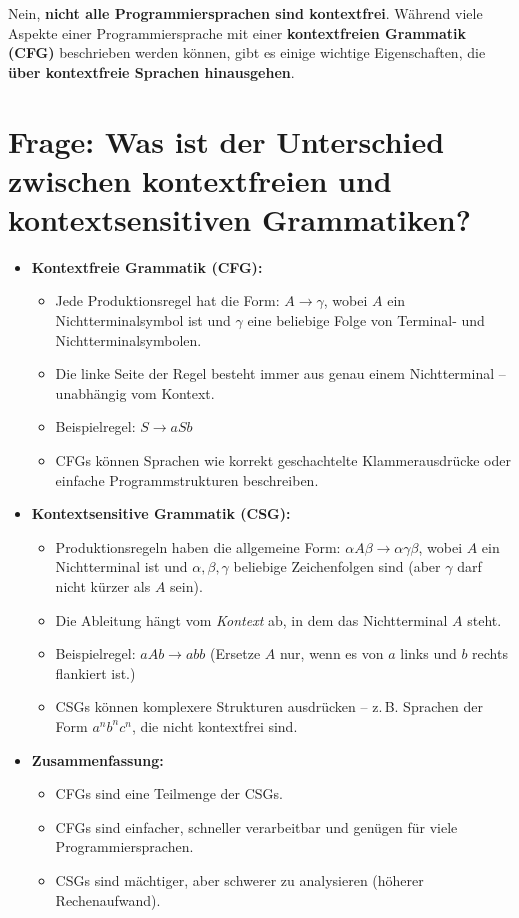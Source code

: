 \documentclass{article}
\begin{document}
\begin{enumerate}
	Nein, \textbf{nicht alle Programmiersprachen sind kontextfrei}. Während viele Aspekte einer Programmiersprache mit einer \textbf{kontextfreien Grammatik (CFG)} beschrieben werden können, gibt es einige wichtige Eigenschaften, die \textbf{über kontextfreie Sprachen hinausgehen}.
	
	
	\section*{Frage: Was ist der Unterschied zwischen kontextfreien und kontextsensitiven Grammatiken?}
	
	\begin{itemize}
		\item \textbf{Kontextfreie Grammatik (CFG):}
		\begin{itemize}
			\item Jede Produktionsregel hat die Form: \( A \rightarrow \gamma \), wobei \( A \) ein Nichtterminalsymbol ist und \( \gamma \) eine beliebige Folge von Terminal- und Nichtterminalsymbolen.
			\item Die linke Seite der Regel besteht immer aus genau einem Nichtterminal – unabhängig vom Kontext.
			\item Beispielregel: \( S \rightarrow aSb \)
			\item CFGs können Sprachen wie korrekt geschachtelte Klammerausdrücke oder einfache Programmstrukturen beschreiben.
		\end{itemize}
		
		\item \textbf{Kontextsensitive Grammatik (CSG):}
		\begin{itemize}
			\item Produktionsregeln haben die allgemeine Form: \( \alpha A \beta \rightarrow \alpha \gamma \beta \), wobei \( A \) ein Nichtterminal ist und \( \alpha, \beta, \gamma \) beliebige Zeichenfolgen sind (aber \( \gamma \) darf nicht kürzer als \( A \) sein).
			\item Die Ableitung hängt vom \emph{Kontext} ab, in dem das Nichtterminal \( A \) steht.
			\item Beispielregel: \( aAb \rightarrow abb \) (Ersetze \( A \) nur, wenn es von \( a \) links und \( b \) rechts flankiert ist.)
			\item CSGs können komplexere Strukturen ausdrücken – z.\,B. Sprachen der Form \( a^n b^n c^n \), die nicht kontextfrei sind.
		\end{itemize}
		
		\item \textbf{Zusammenfassung:}
		\begin{itemize}
			\item CFGs sind eine Teilmenge der CSGs.
			\item CFGs sind einfacher, schneller verarbeitbar und genügen für viele Programmiersprachen.
			\item CSGs sind mächtiger, aber schwerer zu analysieren (höherer Rechenaufwand).
		\end{itemize}
	\end{itemize}
	

\end{enumerate}
\end{document}
